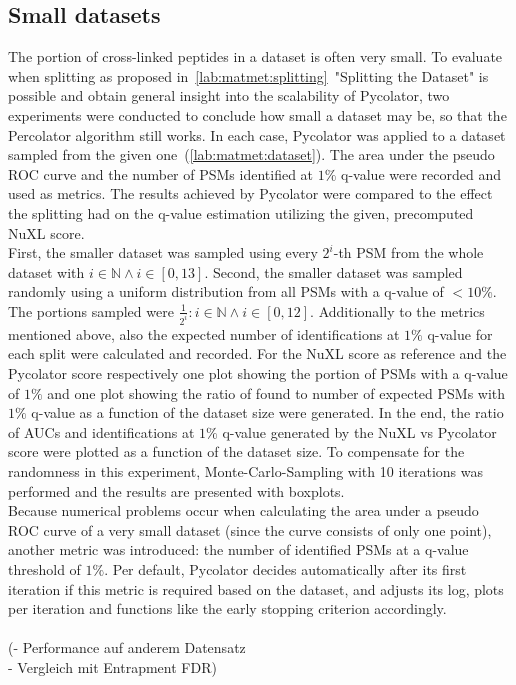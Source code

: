 \subsection{Small datasets}
\label{lab:matmet:small_datasets}
The portion of cross-linked peptides in a dataset is often very small. To evaluate when splitting as proposed in~\ref{lab:matmet:splitting}~"Splitting the Dataset" is possible and obtain general insight into the scalability of Pycolator, two experiments were conducted to conclude how small a dataset may be, so that the Percolator algorithm still works. In each case, Pycolator was applied to a dataset sampled from the given one~(\ref{lab:matmet:dataset}). The area under the pseudo ROC curve and the number of PSMs identified at $1\%$ q-value were recorded and used as metrics. The results achieved by Pycolator were compared to the effect the splitting had on the q-value estimation utilizing the given, precomputed NuXL score.\\
First, the smaller dataset was sampled using every $2^i$-th PSM from the whole dataset with $i\in\mathbb{N} \land i\in[0,13]$. Second, the smaller dataset was sampled randomly using a uniform distribution from all PSMs with a q-value of $<10\%$. The portions sampled were $\frac{1}{2^i} : i\in\mathbb{N} \land i\in[0,12]$. Additionally to the metrics mentioned above, also the expected number of identifications at $1\%$ q-value for each split were calculated and recorded. For the NuXL score as reference and the Pycolator score respectively one plot showing the portion of PSMs with a q-value of $1\%$ and one plot showing the ratio of found to number of expected PSMs with $1\%$ q-value as a function of the dataset size were generated. In the end, the ratio of AUCs and identifications at $1\%$ q-value generated by the NuXL vs Pycolator score were plotted as a function of the dataset size. To compensate for the randomness in this experiment, Monte-Carlo-Sampling with 10 iterations was performed and the results are presented with boxplots.\\
Because numerical problems occur when calculating the area under a pseudo ROC curve of a very small dataset (since the curve consists of only one point), another metric was introduced: the number of identified PSMs at a q-value threshold of $1\%$. Per default, Pycolator decides automatically after its first iteration if this metric is required based on the dataset, and adjusts its log, plots per iteration and functions like the early stopping criterion accordingly.\\\\
(- Performance auf anderem Datensatz\\
- Vergleich mit Entrapment FDR)